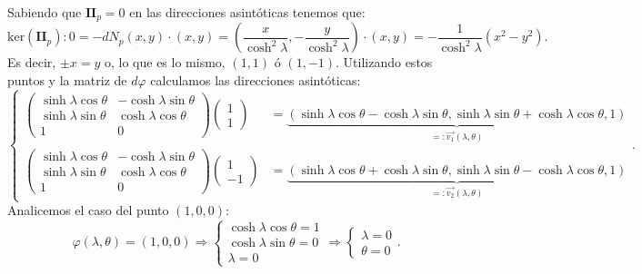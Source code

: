 Sabiendo que $\mathbf{II}_p = 0$ en las direcciones asintóticas tenemos que:
\[
\mathrm{ker} \left( \mathbf{II}_p \right): 0 = -dN_p \left( x, y \right) \cdot
\left( x, y \right) = \left( \frac{x}{\cosh^2 \lambda}, -\frac{y}{\cosh^2
\lambda} \right) \cdot \left( x, y \right) = -\frac{1}{\cosh^2 \lambda} \left(
x^2 - y^2 \right).
\]
Es decir, $\pm x = y$ o, lo que es lo mismo, $\left( 1, 1 \right)$ ó $\left( 1,
-1\right)$. Utilizando estos puntos y la matriz de $d \varphi$ calculamos las
direcciones asintóticas: 
\[
\begin{cases}
    \begin{pmatrix} 
    \sinh \lambda \cos \theta & -\cosh \lambda \sin \theta\\
    \sinh \lambda \sin \theta & \cosh \lambda \cos \theta\\
    1 & 0
    \end{pmatrix} \begin{pmatrix} 1 \\ 1 \end{pmatrix} &= 
\underbrace{\left( \sinh \lambda \cos \theta - \cosh \lambda \sin \theta, \sinh \lambda
    \sin \theta + \cosh \lambda \cos \theta, 1
\right)}_{=: \overrightarrow{v_1}\left( \lambda, \theta \right)}\\

    \begin{pmatrix} 
    \sinh \lambda \cos \theta & -\cosh \lambda \sin \theta\\
    \sinh \lambda \sin \theta & \cosh \lambda \cos \theta\\
    1 & 0
    \end{pmatrix} \begin{pmatrix} 1 \\ -1 \end{pmatrix} &= 
    \underbrace{\left( \sinh \lambda \cos \theta + \cosh \lambda \sin \theta, \sinh \lambda
    \sin \theta - \cosh \lambda \cos \theta, 1 \right)}_{=:
    \overrightarrow{v_2}\left( \lambda, \theta \right)}
\end{cases}.
\]
Analicemos el caso del punto $\left( 1, 0, 0 \right)$:
\[
\varphi\left( \lambda, \theta \right) = \left( 1, 0, 0 \right) \Rightarrow \begin{cases}
    \cosh \lambda \cos \theta = 1\\
    \cosh \lambda \sin \theta = 0\\
    \lambda = 0
\end{cases} \Rightarrow \begin{cases}
    \lambda = 0\\
    \theta = 0
\end{cases}.
\]
